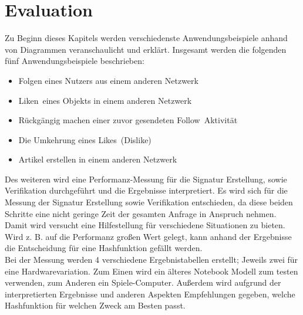 
\chapter{Evaluation}
\label{ch:Evaluation}
Zu Beginn dieses Kapitels werden verschiedenste Anwendungsbeispiele anhand von Diagrammen veranschaulicht und erklärt. Insgesamt werden die folgenden fünf Anwendungsbeispiele beschrieben:
\begin{itemize}
	\item Folgen eines Nutzers aus einem anderen Netzwerk
	\item \glqq Liken\grqq~eines Objekts in einem anderen Netzwerk
	\item Rückgängig machen einer zuvor gesendeten \glqq Follow\grqq~Aktivität
	\item Die Umkehrung eines \glqq Likes\grqq~(Dislike)
	\item Artikel erstellen in einem anderen Netzwerk
\end{itemize}
Des weiteren wird eine Performanz-Messung für die Signatur Erstellung, sowie Verifikation durchgeführt und die Ergebnisse interpretiert. Es wird sich für die Messung der Signatur Erstellung sowie Verifikation entschieden, da diese beiden Schritte eine nicht geringe Zeit der gesamten Anfrage in Anspruch nehmen. Damit wird versucht eine Hilfestellung für verschiedene Situationen zu bieten. Wird z. B. auf die Performanz großen Wert gelegt, kann anhand der Ergebnisse die Entscheidung für eine Hashfunktion gefällt werden.\\

Bei der Messung werden 4 verschiedene Ergebnistabellen erstellt; Jeweils zwei für eine Hardwarevariation. Zum Einen wird ein älteres Notebook Modell zum testen verwenden, zum Anderen ein Spiele-Computer. Außerdem wird aufgrund der interpretierten Ergebnisse und anderen Aspekten Empfehlungen gegeben, welche Hashfunktion für welchen Zweck am Besten passt.
